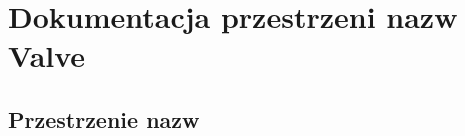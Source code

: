 \hypertarget{namespace_valve}{}\section{Dokumentacja przestrzeni nazw Valve}
\label{namespace_valve}
\subsection*{Przestrzenie nazw}
\begin{DoxyCompactItemize}
\end{DoxyCompactItemize}

